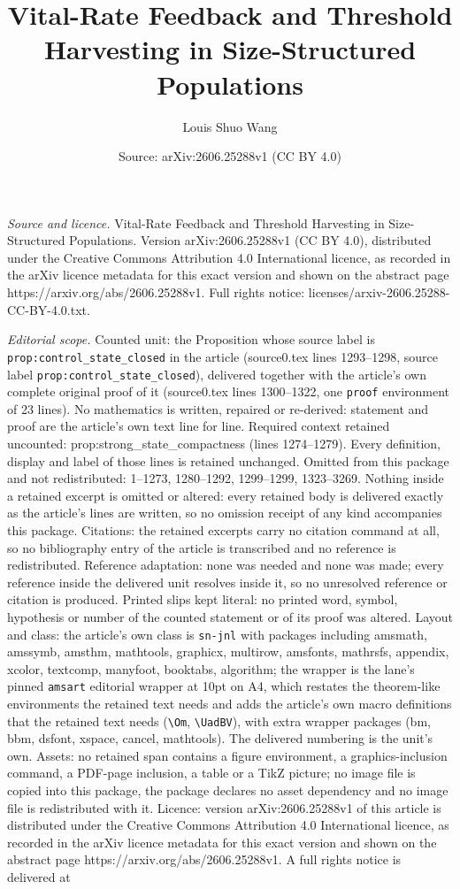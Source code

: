 \documentclass[10pt,a4paper]{amsart}
\title[Vital-Rate Feedback and Threshold Harvesting in Size-Structu]{Vital-Rate Feedback and Threshold Harvesting in Size-Structured Populations}
\author{Louis Shuo Wang}
\date{Source: arXiv:2606.25288v1 (CC BY 4.0)}
\begin{document}
\maketitle

\noindent\emph{Source and licence.} Vital-Rate Feedback and Threshold Harvesting in Size-Structured Populations. Version arXiv:2606.25288v1 (CC BY 4.0), distributed under the Creative Commons Attribution 4.0 International licence, as recorded in the arXiv licence metadata for this exact version and shown on the abstract page https://arxiv.org/abs/2606.25288v1. Full rights notice: licenses/arxiv-2606.25288-CC-BY-4.0.txt.\par\smallskip

\noindent\textit{Editorial scope.} Counted unit: the Proposition whose source label is \texttt{prop:control\_state\_closed} in the article (source0.tex lines 1293--1298, source label \texttt{prop:control\_state\_closed}), delivered together with the article's own complete original proof of it (source0.tex lines 1300--1322, one \texttt{proof} environment of 23 lines). No mathematics is written, repaired or re-derived: statement and proof are the article's own text line for line. Required context retained uncounted: prop:strong\_state\_compactness (lines 1274--1279). Every definition, display and label of those lines is retained unchanged. Omitted from this package and not redistributed: 1--1273, 1280--1292, 1299--1299, 1323--3269. Nothing inside a retained excerpt is omitted or altered: every retained body is delivered exactly as the article's lines are written, so no omission receipt of any kind accompanies this package. Citations: the retained excerpts carry no citation command at all, so no bibliography entry of the article is transcribed and no reference is redistributed. Reference adaptation: none was needed and none was made; every reference inside the delivered unit resolves inside it, so no unresolved reference or citation is produced. Printed slips kept literal: no printed word, symbol, hypothesis or number of the counted statement or of its proof was altered. Layout and class: the article's own class is \texttt{sn-jnl} with packages including amsmath, amssymb, amsthm, mathtools, graphicx, multirow, amsfonts, mathrsfs, appendix, xcolor, textcomp, manyfoot, booktabs, algorithm; the wrapper is the lane's pinned \texttt{amsart} editorial wrapper at 10pt on A4, which restates the theorem-like environments the retained text needs and adds the article's own macro definitions that the retained text needs (\texttt{\textbackslash Om}, \texttt{\textbackslash UadBV}), with extra wrapper packages (bm, bbm, dsfont, xspace, cancel, mathtools). The delivered numbering is the unit's own. Assets: no retained span contains a figure environment, a graphics-inclusion command, a PDF-page inclusion, a table or a TikZ picture; no image file is copied into this package, the package declares no asset dependency and no image file is redistributed with it. Licence: version arXiv:2606.25288v1 of this article is distributed under the Creative Commons Attribution 4.0 International licence, as recorded in the arXiv licence metadata for this exact version and shown on the abstract page https://arxiv.org/abs/2606.25288v1. A full rights notice is delivered at 
\end{document}
